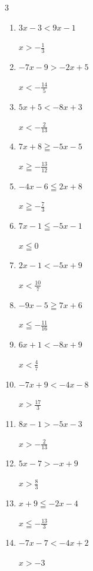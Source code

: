 \begin{multicols}{3}
\begin{enumerate}
  \item $3x-3<9x-1$

        $\displaystyle x>-\frac{1}{3}$

  \item $-7x-9>-2x+5$

        $\displaystyle x<-\frac{14}{5}$

  \item $5x+5<-8x+3$

        $\displaystyle x<-\frac{2}{13}$

  \item $7x+8\geqq -5x-5$

        $\displaystyle x\geqq -\frac{13}{12}$

\columnbreak %

  \item $-4x-6\leqq 2x+8$

        $\displaystyle x\geqq -\frac{7}{3}$

  \item $7x-1\leqq -5x-1$

        $\displaystyle x\leqq 0$

  \item $2x-1<-5x+9$

        $\displaystyle x<\frac{10}{7}$

  \item $-9x-5\geqq 7x+6$

        $\displaystyle x\leqq -\frac{11}{16}$

  \item $6x+1<-8x+9$

        $\displaystyle x<\frac{4}{7}$

  \item $-7x+9<-4x-8$

        $\displaystyle x>\frac{17}{3}$

  \item $8x-1>-5x-3$

        $\displaystyle x>-\frac{2}{13}$

  \item $5x-7>-x+9$

        $\displaystyle x>\frac{8}{3}$

  \item $x+9\leqq -2x-4$

        $\displaystyle x\leqq -\frac{13}{3}$

  \item $-7x-7<-4x+2$

        $\displaystyle x>-3$


\end{enumerate}
\end{multicols}
